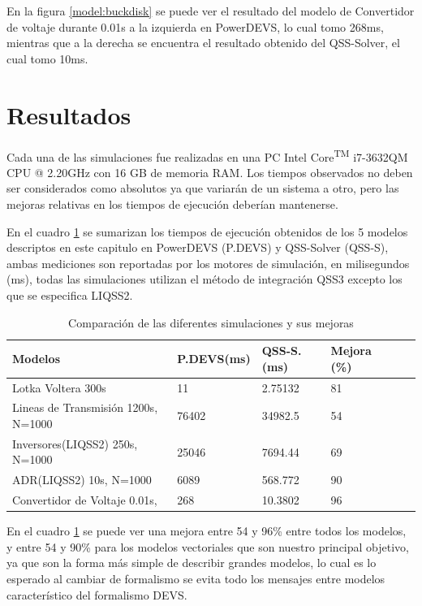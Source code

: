 En la figura \ref{model:buckdisk} se puede ver el resultado del modelo de Convertidor de voltaje durante 0.01s a la izquierda en PowerDEVS, lo cual tomo 268ms, 
mientras que a la derecha se encuentra el resultado obtenido del QSS-Solver, el cual tomo 10ms.

\section{Resultados}

	Cada una de las simulaciones fue realizadas en una PC Intel\textsuperscript{\textregistered} Core\textsuperscript{TM} i7-3632QM CPU @ 2.20GHz con 16 GB de
	 memoria RAM. Los tiempos observados no deben ser considerados como absolutos ya que variarán de un sistema a otro, pero las mejoras relativas en los tiempos de ejecución deberían mantenerse.

	En el cuadro \ref{tab:result} se sumarizan los tiempos de ejecución obtenidos de los 5 modelos descriptos en este capitulo en  
	PowerDEVS (P.DEVS) y QSS-Solver (QSS-S), ambas mediciones son reportadas por los motores de simulación, en milisegundos (ms),
	 todas las simulaciones utilizan el método de integración QSS3 excepto los que se especifica LIQSS2.

\begin{table}[H]
\centering	
\begin{tabular}{llllll}
\toprule
{\bf Modelos}            &  {\bf P.DEVS(ms)} & {\bf QSS-S. (ms)} & {\bf Mejora (\%)} \\
\toprule
Lotka  Voltera 300s      		& 11            & 2.75132         & 81 \\
Lineas de Transmisión 1200s, N=1000     & 76402         & 34982.5         & 54          \\
Inversores(LIQSS2) 250s, N=1000   	& 25046         & 7694.44         & 69        \\
ADR(LIQSS2) 10s, N=1000 		& 6089          & 568.772         & 90        \\
Convertidor de Voltaje 0.01s,        	& 268           & 10.3802         & 96         

\end{tabular}
\caption{Comparación de las diferentes simulaciones y sus mejoras}\label{tab:result}
\end{table}

	En el cuadro \ref{tab:result} se puede ver una mejora entre 54 y 96\% entre todos los modelos, y entre 54 y 90\% para los modelos vectoriales que son nuestro 
	principal objetivo, ya que son la forma más simple de describir grandes modelos, lo cual es lo esperado al cambiar de formalismo se evita todo los 
	mensajes entre modelos característico del formalismo DEVS.
